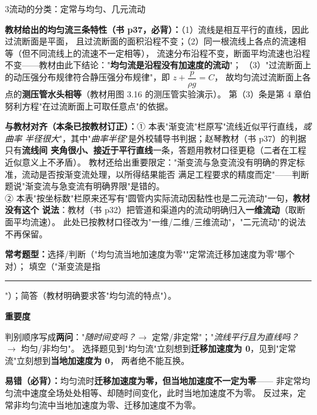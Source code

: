 \begin{kaodian}{3}{流动的分类：定常与均匀、几元流动}
\begin{jielun}
\textbf{教材给出的均匀流三条特性（书 p37，必背）：}（1）流线是相互平行的直线，因此过流断面是平面，
且过流断面的面积沿程不变；（2）同一根流线上各点的流速相等（但不同流线上的流速不一定相等），
流速分布沿程不变，断面平均流速也沿程不变——教材由此下结论："\textbf{均匀流是沿程没有加速度的流动}"；
（3）"过流断面上的动压强分布规律符合静压强分布规律"，即 $z+\dfrac{p}{\rho g}=C$，
故均匀流过流断面上各点的\textbf{测压管水头相等}（教材用图 3.16 的测压管实验演示）。
第（3）条是第 4 章伯努利方程"在过流断面上可取任意点"的依据。
\end{jielun}

\begin{tishi}
\textbf{与教材对齐（本条已按教材订正）：}① 本表"渐变流"栏原写"流线近似平行直线，\emph{或曲率
半径很大}"，其中"\emph{曲率半径}"是外校辅导书判据；赵琴教材（书 p37）的判据只有\textbf{流线间
夹角很小、接近于平行直线}一条，答题用教材口径更稳（二者在工程近似意义上不矛盾）。
教材还给出重要限定："渐变流与急变流没有明确的界定标准，流动是否按渐变流处理，以所得结果能否
满足工程要求的精度而定"——判断题说"渐变流与急变流有明确界限"是错的。\\
② 本表"按坐标数"栏原来还写有"圆管内实际流动因黏性也是二元流动"一句，\textbf{教材没有这个
说法}：教材（书 p32）把管道和渠道内的流动明确归入\textbf{一维流动}（取断面平均流速）。
此处已按教材口径改为"一维/二维/三维流动"，"二元流动"的说法不再保留。
\end{tishi}

\textbf{常考题型：}选择/判断（"均匀流当地加速度为零""定常流迁移加速度为零"哪个对）；
填空（"渐变流是指\rule{3cm}{0.4pt}"）；简答（教材明确要求答"均匀流的特点"）。

\textbf{重要度 }\quad{}\quad{}

\begin{banfa}
判别顺序写成\textbf{两问}："\emph{随时间变吗？}$\to$ 定常/非定常"；"\emph{流线平行且为直线吗？}$\to$ 均匀/非均匀"。
选择题见到"均匀流"立刻想到\textbf{迁移加速度为 0}，见到"定常流"立刻想到\textbf{当地加速度为 0}，
两者绝不能互换。
\end{banfa}

\begin{yicuo}
\textbf{易错（必背）：}均匀流时\textbf{迁移加速度为零，但当地加速度不一定为零}——
非定常均匀流中速度全场处处相等、却随时间变化，此时当地加速度不为零。
反过来，定常非均匀流中当地加速度为零、迁移加速度不为零。
\end{yicuo}
\end{kaodian}

